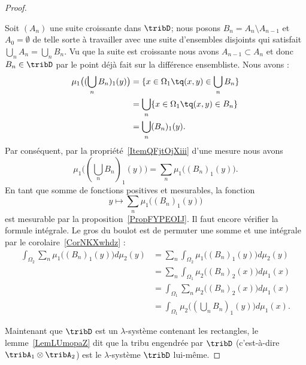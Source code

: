 \begin{proof}
\begin{subproof}

		Soit \( (A_n)\) une suite croissante dans \( \tribD\); nous posons \( B_n=A_n\setminus A_{n-1}\) et \( A_0=\emptyset\) de telle sorte à travailler avec une suite d'ensembles disjoints qui satisfait \( \bigcup_nA_n=\bigcup_nB_n\). Vu que la suite est croissante nous avons \( A_{n-1}\subset A_n\) et donc \( B_n\in\tribD\) par le point déjà fait sur la différence ensembliste. Nous avons :
		\begin{subequations}
			\begin{align}
				\mu_1\big( (\bigcup_nB_n)_1(y) \big) & =\{ x\in \Omega_1\tq (x,y)\in\bigcup_nB_n \} \\
				                                     & =\bigcup_n\{ x\in\Omega_1\tq (x,y)\in B_n \} \\
				                                     & =\bigcup_n (B_n)_1(y).
			\end{align}
		\end{subequations}
		Par conséquent, par la propriété~\ref{ItemQFjtOjXiii} d'une mesure nous avons
		\begin{equation}
			\mu_1\big( (\bigcup_nB_n)_1(y) \big)=\sum_n\mu_1\big( (B_n)_1(y) \big).
		\end{equation}
		En tant que somme de fonctions positives et mesurables, la fonction
		\begin{equation}
			y\mapsto\sum_n\mu_1\big( (B_n)_1(y) \big)
		\end{equation}
		est mesurable par la proposition~\ref{PropFYPEOIJ}. Il faut encore vérifier la formule intégrale. Le gros du boulot est de permuter une somme et une intégrale par le corolaire~\ref{CorNKXwhdz} :
		\begin{subequations}
			\begin{align}
				\int_{\Omega_2}\sum_n\mu_1\big( (B_n)_1(y) \big)d\mu_2(y) & =\sum_n\int_{\Omega_2}\mu_1\big( (B_n)_1(y) \big)d\mu_2(y)     \\
				                                                          & =\sum_n\int_{\Omega_1}\mu_2\big( (B_n)_2(x) \big)d\mu_1(x)     \\
				                                                          & =\int_{\Omega_1}\sum_n\mu_2\big( (B_n)_2(x) \big)d\mu_1(x)     \\
				                                                          & =\int_{\Omega_1}\mu_2\big( (\bigcup_nB_n)_1(y) \big)d\mu_1(x).
			\end{align}
		\end{subequations}
	\end{subproof}
	Maintenant que \( \tribD\) est un \( \lambda\)-système contenant les rectangles, le lemme~\ref{LemLUmopaZ} dit que la tribu engendrée par \( \tribD\) (c'est-à-dire \( \tribA_1\otimes \tribA_2\)) est le \( \lambda\)-système \( \tribD\) lui-même.


\end{proof}
